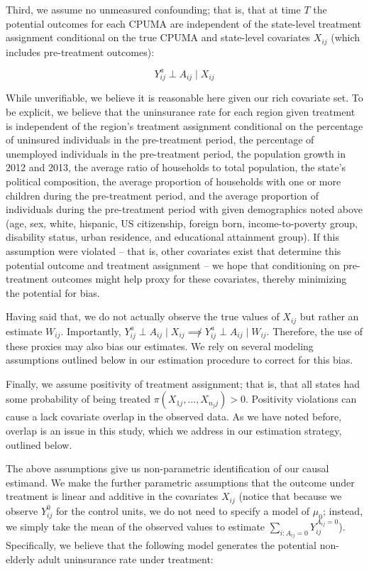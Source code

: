\documentclass[12pt]{article}
\begin{document}
Third, we assume no unmeasured confounding; that is, that at time $T$ the potential outcomes for each CPUMA are independent of the state-level treatment assignment conditional on the true CPUMA and state-level covariates $X_{ij}$ (which includes pre-treatment outcomes):

$$
Y_{ij}^a \perp A_{ij} \mid X_{ij}
$$

While unverifiable, we believe it is reasonable here given our rich covariate set. To be explicit, we believe that the uninsurance rate for each region given treatment is independent of the region's treatment assignment conditional on the percentage of uninsured individuals in the pre-treatment period, the percentage of unemployed individuals in the pre-treatment period, the population growth in 2012 and 2013, the average ratio of households to total population, the state's political composition, the average proportion of households with one or more children during the pre-treatment period, and the average proportion of individuals during the pre-treatment period with given demographics noted above (age, sex, white, hispanic, US citizenship, foreign born, income-to-poverty group, disability status, urban residence, and educational attainment group). If this assumption were violated -- that is, other covariates exist that determine this potential outcome and treatment assignment -- we hope that conditioning on pre-treatment outcomes might help proxy for these covariates, thereby minimizing the potential for bias. 

Having said that, we do not actually observe the true values of $X_{ij}$ but rather an estimate $W_{ij}$. Importantly, $Y_{ij}^a \perp A_{ij} \mid X_{ij} \not\implies Y_{ij}^a \perp A_{ij} \mid W_{ij}$. Therefore, the use of these proxies may also bias our estimates. We rely on several modeling assumptions outlined below in our estimation procedure to correct for this bias.

Finally, we assume positivity of treatment assignment; that is, that all states had some probability of being treated $\pi(X_{1j}, ..., X_{n_jj}) > 0$. Positivity violations can cause a lack covariate overlap in the observed data. As we have noted before, overlap is an issue in this study, which we address in our estimation strategy, outlined below.

The above assumptions give us non-parametric identification of our causal estimand. We make the further parametric assumptions that the outcome under treatment is linear and additive in the covariates $X_{ij}$ (notice that because we observe $Y_{ij}^0$ for the control units, we do not need to specify a model of $\mu_0$; instead, we simply take the mean of the observed values to estimate $\sum_{i: A_{ij} = 0} Y_{ij}^{A_{ij} = 0}$). Specifically, we believe that the following model generates the potential non-elderly adult uninsurance rate under treatment:
\end{document}
